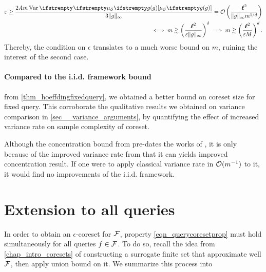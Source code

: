 \begin{align*}
	\epsilon 
	\geq  \frac{2 A m \Var{}{\empdistr{\mathcal{S}}{\twoquery}}}{3\|\twoquery \|_{\infty}}
	= \OO\left(\frac{\lipschitz^2}{\|\twoquery \|_{\infty} m^{1/d}}\right)\\
	\iff
	m \gtrsim \left(\frac{\lipschitz^2}{\epsilon\|\twoquery \|_{\infty}}\right)^d
	\implies
	m \gtrsim \left(\frac{\lipschitz^2}{\epsilon\bound}\right)^d.
\end{align*}
Thereby, the condition on $\epsilon$ translates to a much worse bound on $m$, ruining the interest of the second case.
		 


\paragraph{Compared to the i.i.d. framework bound} from \cref{thm_hoeffdingfixedquery}, we obtained a better bound on coreset size for fixed query. This corroborate the qualitative results we obtained on variance comparison in \cref{sec__variance_arguments}, by quantifying the effect of increased variance rate on sample complexity of coreset. 

Although the concentration bound from \cite{breuer2013nevai} pre-dates the works of \cite{tremblay2018dppcoreset}, it is only because of the improved variance rate from \cite{bardenet2021sgddpp} that it can yields improved concentration result. If one were to apply classical variance rate in $\mathcal{O}(m^{-1})$ to it, it would find no improvements of the i.i.d. framework.



\section{Extension to all queries}
\label{sec_extension_all_queries}
In order to obtain an $\epsilon$-coreset for $\mathcal{F}$, property \cref{eqn_querycoresetprop} must hold simultaneously for all queries $f \in \mathcal{F}$. To do so, recall the idea from \cref{chap_intro_coresets} of constructing a surrogate finite set that approximate well $\mathcal{F}$, then apply union bound on it. We summarize this process into 


